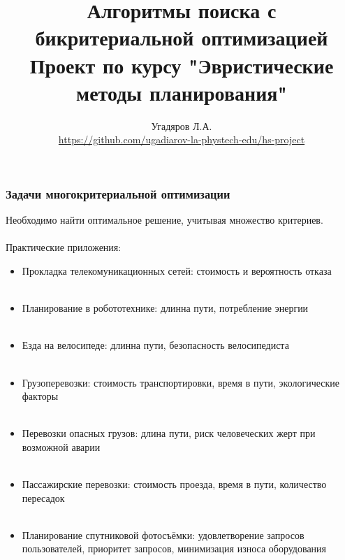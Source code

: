 \documentclass[aspectratio=169,8pt]{beamer}
\title[Алгоритмы поиска с бикритериальной оптимизацией] {Алгоритмы поиска с бикритериальной оптимизацией \\ \small Проект по курсу "Эвристические методы планирования"}
\author[Угадяров Л.А.] {Угадяров Л.А. \\ \small\url{https://github.com/ugadiarov-la-phystech-edu/hs-project}}
\institute{МФТИ, группа М05-006а}
\begin{document}
\begin{frame}
\titlepage
\end{frame}

\begin{frame}
\frametitle{Задачи многокритериальной оптимизации}
Необходимо найти оптимальное решение, учитывая множество критериев.\\ \ \\
Практические приложения:
\begin{itemize}
\item Прокладка телекомуникационных сетей: стоимость и вероятность отказа\\ \ \\
\item Планирование в робототехнике: длинна пути, потребление энергии\\ \ \\
\item Езда на велосипеде: длинна пути, безопасность велосипедиста\\ \ \\
\item Грузоперевозки: стоимость транспортировки, время в пути, экологические факторы\\ \ \\
\item Перевозки опасных грузов: длина пути, риск человеческих жерт при возможной аварии\\ \ \\
\item Пассажирские перевозки: стоимость проезда, время в пути, количество пересадок\\ \ \\
\item Планирование спутниковой фотосъёмки: удовлетворение запросов пользователей, приоритет запросов, минимизация износа оборудования
\end{itemize}
\end{frame}
\end{document}
